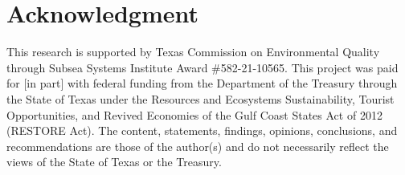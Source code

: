 \documentclass[pdflatex,sn-mathphys-num]{sn-jnl}
\theoremstyle{thmstyleone}%
\begin{document}
\section*{Acknowledgment}
This research is supported by Texas Commission on Environmental Quality through Subsea Systems Institute Award \#582-21-10565. This project was paid for [in part] with federal funding from the Department of the Treasury through the State of Texas under the Resources and Ecosystems Sustainability, Tourist Opportunities, and Revived Economies of the Gulf Coast States Act of 2012 (RESTORE Act).  The content, statements, findings, opinions, conclusions, and recommendations are those of the author(s) and do not necessarily reflect the views of the State of Texas or the Treasury.

\end{document}
